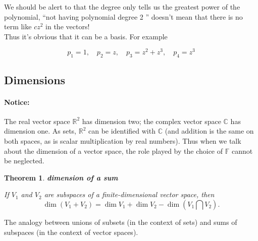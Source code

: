 \documentclass{article}
\newtheorem{theorem}{Theorem}[subsection]
\newcommand{\RR}{\mathbb{R}}
\newcommand{\CC}{\mathbb{C}}
\newcommand{\FF}{\mathbb{F}}
\begin{document}
\begin{CJK}{UTF8}{gkai}
We should be alert to that the degree only tells us the greatest power of the polynomial, ``not having polynomial degree 2 '' doesn't mean that there is no term like $c z^2$ in the vectors!\\

Thus it's obvious that it can be a basis. For example

\[p_1 = 1, \quad p_2 = z,\quad p_3 = z^2 + z^3,\quad p_4 = z^3\]

\subsection{Dimensions}
\paragraph{Notice:}

The real vector space $\RR^2$ has dimension two; the complex vector space $\CC$ has dimension one. As sets, $\RR^2$ can be identified with $\CC$ (and addition is the same on both spaces, as is scalar multiplication by real numbers). Thus when we talk about the dimension of a vector space, the role played by the choice of $\FF$ cannot be neglected.

\begin{theorem}
    \textbf{dimension of a sum}

    If $V_1$ and $V_2$ are subspaces of a finite-dimensional vector space, then
    \[\dim (V_1 + V_2) = \dim V_1 +\dim V_2 -\dim (V_1 \bigcap V_2).\]
\end{theorem}

The analogy between unions of subsets (in the context of sets) and sums of subspaces (in the context of vector spaces).\\

\begin{center}
    

\end{center}
\end{CJK}
\end{document}
